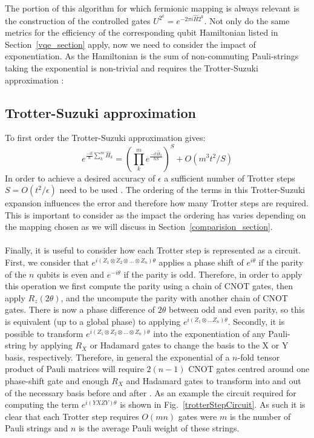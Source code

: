 \documentclass[twoside]{article}
\begin{document}
The portion of this algorithm for which fermionic mapping is always relevant is the construction of the controlled gates $U^{2^k} = e^{-2 \pi i \hat H 2^k}$. Not only do the same metrics for the efficiency of the corresponding qubit Hamiltonian listed in Section~\ref{vqe_section} apply, now we need to consider the impact of exponentiation. As the Hamiltonian is the sum of non-commuting Pauli-strings taking the exponential is non-trivial and requires the Trotter-Suzuki approximation \cite{suzuki}:
\subsection{Trotter-Suzuki approximation}\label{trotter}
To first order the Trotter-Suzuki approximation gives:
\begin{equation}
        e^{\frac{-it}{\hbar} \sum^m_k \hat H_k} = \left( \prod^m_k e^{\frac{-i t \hat H_k}{\hbar S}}\right)^S + O(m^3 t^2/S)
\end{equation}
In order to achieve a desired accuracy of $\epsilon$ a sufficient number of Trotter steps $S= O(t^2/ \epsilon)$ need to be used \cite{chemistryReview}. The ordering of the terms in this Trotter-Suzuki expansion influences the error and therefore how many Trotter steps are required. This is important to consider as the impact the ordering has varies depending on the mapping chosen as we will discuss in Section~\ref{comparision_section}.\\\\
Finally, it is useful to consider how each Trotter step is represented as a circuit. First, we consider that $e^{i(Z_1 \otimes Z_2 \otimes ... \otimes Z_n)\theta}$ applies a phase shift of $e^{i\theta}$ if the parity of the $n$ qubits is even and $e^{-i\theta}$ if the parity is odd. Therefore, in order to apply this operation we first compute the parity using a chain of CNOT gates, then apply $R_z(2 \theta)$, and the uncompute the parity with another chain of CNOT gates. There is now a phase difference of $2 \theta$ between odd and even parity, so this is equivalent (up to a global phase) to applying $e^{i ( Z_1 \otimes \ldots Z_n) \theta}$. Secondly, it is possible to transform $e^{i(Z_1 \otimes Z_2 \otimes ... \otimes Z_n)\theta}$ into the exponentiation of any Pauli-string by applying $R_X$ or Hadamard gates to change the basis to the X or Y basis, respectively. Therefore, in general the exponential of a $n$-fold tensor product of Pauli matrices will require $2(n-1)$ CNOT gates centred around one phase-shift gate and enough $R_X$ and Hadamard gates to transform into and out of the necessary basis before and after \cite{seeley}. As an example the circuit required for computing the term $e^{i(YXZY)\theta}$ is shown in Fig.~\ref{trotterStepCircuit}. As such it is clear that each Trotter step requires $O(mn)$ gates were $m$ is the number of Pauli strings and $n$ is the average Pauli weight of these strings.
\end{document}
